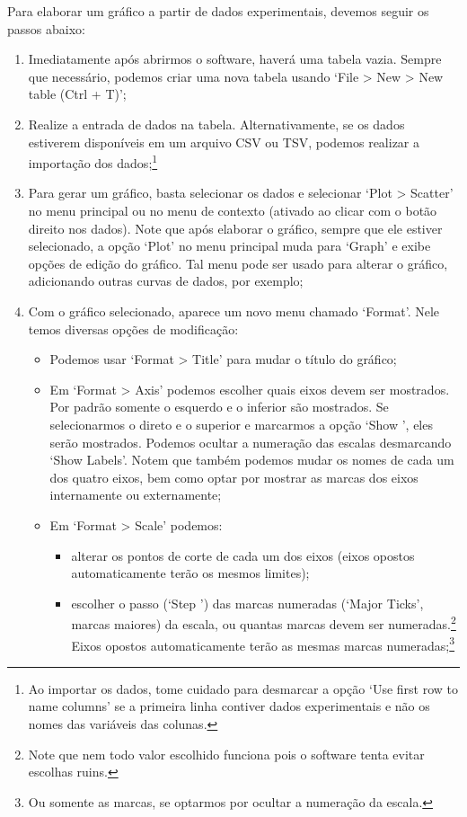 Para elaborar um gráfico a partir de dados experimentais, devemos seguir os passos abaixo:
\begin{enumerate}
    \item Imediatamente após abrirmos o software, haverá uma tabela vazia. Sempre que necessário, podemos criar uma nova tabela usando `\textsf{File > New > New table (Ctrl + T)}';
    \item Realize a entrada de dados na tabela. Alternativamente, se os dados estiverem disponíveis em um arquivo CSV ou TSV, podemos realizar a importação dos dados;\footnote{Ao importar os dados, tome cuidado para desmarcar a opção `\textsf{Use first row to name columns}' se a primeira linha contiver dados experimentais e não os nomes das variáveis das colunas.}
    \item Para gerar um gráfico, basta selecionar os dados e selecionar `\textsf{Plot > Scatter}' no menu principal ou no menu de contexto (ativado ao clicar com o botão direito nos dados). Note que após elaborar o gráfico, sempre que ele estiver selecionado, a opção `\textsf{Plot}' no menu principal muda para `\textsf{Graph}' e exibe opções de edição do gráfico. Tal menu pode ser usado para alterar o gráfico, adicionando outras curvas de dados, por exemplo;
    \item Com o gráfico selecionado, aparece um novo menu chamado `\textsf{Format}'. Nele temos diversas opções de modificação:
        \begin{itemize}
            \item Podemos usar `\textsf{Format > Title}' para mudar o título do gráfico;
            \item Em `\textsf{Format > Axis}' podemos escolher quais eixos devem ser mostrados. Por padrão somente o esquerdo e o inferior são mostrados. Se selecionarmos o direto e o superior e marcarmos a opção `\textsf{Show} ', eles serão mostrados. Podemos ocultar a numeração das escalas desmarcando `\textsf{Show Labels}'. Notem que também podemos mudar os nomes de cada um dos quatro eixos, bem como optar por mostrar as marcas dos eixos internamente ou externamente;
            \item Em `\textsf{Format > Scale}' podemos:
                \begin{itemize}
                    \item alterar os pontos de corte de cada um dos eixos (eixos opostos automaticamente terão os mesmos limites);
                    \item escolher o passo (`\textsf{Step} ') das marcas numeradas (`\textsf{Major Ticks}', marcas maiores) da escala, ou quantas marcas devem ser numeradas.\footnote{Note que nem todo valor escolhido funciona pois o software tenta evitar escolhas ruins.} Eixos opostos automaticamente terão as mesmas marcas numeradas;\footnote{Ou somente as marcas, se optarmos por ocultar a numeração da escala.}

\end{itemize}
\end{itemize}
\end{enumerate}
